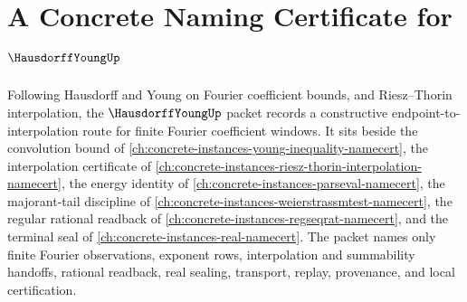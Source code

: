 \chapter{A Concrete Naming Certificate for $\HausdorffYoungUp$}
\label{ch:concrete-instances-hausdorff-young-namecert}

Following Hausdorff and Young on Fourier coefficient bounds, and Riesz--Thorin interpolation, the $\HausdorffYoungUp$ packet records a constructive endpoint-to-interpolation route for finite Fourier coefficient windows. It sits beside the convolution bound of \autoref{ch:concrete-instances-young-inequality-namecert}, the interpolation certificate of \autoref{ch:concrete-instances-riesz-thorin-interpolation-namecert}, the energy identity of \autoref{ch:concrete-instances-parseval-namecert}, the majorant-tail discipline of \autoref{ch:concrete-instances-weierstrassmtest-namecert}, the regular rational readback of \autoref{ch:concrete-instances-regseqrat-namecert}, and the terminal seal of \autoref{ch:concrete-instances-real-namecert}. The packet names only finite Fourier observations, exponent rows, interpolation and summability handoffs, rational readback, real sealing, transport, replay, provenance, and local certification.

